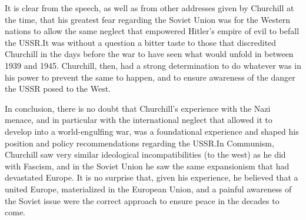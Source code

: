 \documentclass[12pt,letterpaper]{article}
\begin{document}
\begin{spacing}{2}
    It is clear from the speech, as well as from other addresses given by
    Churchill at the time, that his greatest fear regarding the Soviet Union was
    for the Western nations to allow the same neglect that empowered Hitler's
    empire of evil to befall the USSR.\@ It was without a question a bitter
    taste to those that discredited Churchill in the days before the war to have
    seen what would unfold in between 1939 and 1945. Churchill, then, had a
    strong determination to do whatever was in his power to prevent the same to
    happen, and to ensure awareness of the danger the USSR posed to the West.

    In conclusion, there is no doubt that Churchill's experience with the Nazi
    menace, and in particular with the international neglect that allowed it to
    develop into a world-engulfing war, was a foundational experience and shaped
    his position and policy recommendations regarding the USSR.\@ In Communism,
    Churchill saw very similar ideological incompatibilities (to the west) as he
    did with Fascism, and in the Soviet Union he saw the same expansionism that
    had devastated Europe. It is no surprise that, given his experience, he
    believed that a united Europe, materialized in the European Union, and a
    painful awareness of the Soviet issue were the correct approach to ensure
    peace in the decades to come.
\end{spacing}
\newpage
\end{document}
